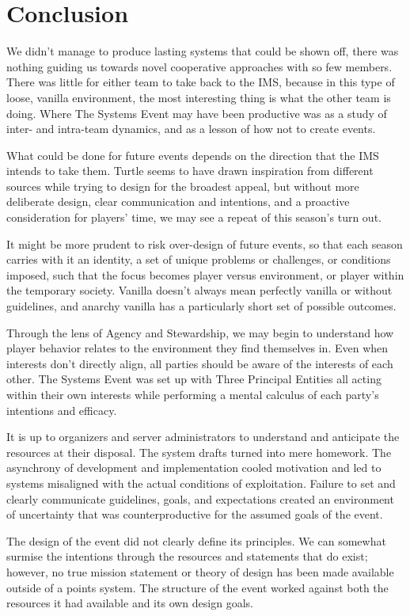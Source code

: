 \section{Conclusion}
We didn't manage to produce lasting systems that could be shown off, there was nothing guiding us towards novel cooperative approaches with so few members. There was little for either team to take back to the IMS, because in this type of loose, vanilla environment, the most interesting thing is what the other team is doing. Where The Systems Event may have been productive was as a study of inter- and intra-team dynamics, and as a lesson of how not to create events.

What could be done for future events depends on the direction that the IMS intends to take them. Turtle seems to have drawn inspiration from different sources while trying to design for the broadest appeal, but without more deliberate design, clear communication and intentions, and a proactive consideration for players' time, we may see a repeat of this season's turn out.

It might be more prudent to risk over-design of future events, so that each season carries with it an identity, a set of unique problems or challenges, or conditions imposed, such that the focus becomes player versus environment, or player within the temporary society. Vanilla doesn't always mean perfectly vanilla or without guidelines, and anarchy vanilla has a particularly short set of possible outcomes.

Through the lens of Agency and Stewardship, we may begin to understand how player behavior relates to the environment they find themselves in. Even when interests don't directly align, all parties should be aware of the interests of each other. The Systems Event was set up with Three Principal Entities all acting within their own interests while performing a mental calculus of each party's intentions and efficacy.

It is up to organizers and server administrators to understand and anticipate the resources at their disposal. The system drafts turned into mere homework. The asynchrony of development and implementation cooled motivation and led to systems misaligned with the actual conditions of exploitation. Failure to set and clearly communicate guidelines, goals, and expectations created an environment of uncertainty that was counterproductive for the assumed goals of the event.

The design of the event did not clearly define its principles. We can somewhat surmise the intentions through the resources and statements that do exist; however, no true mission statement or theory of design has been made available outside of a points system. The structure of the event worked against both the resources it had available and its own design goals.

